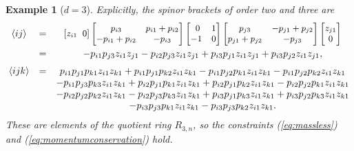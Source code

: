 \documentclass[english]{ourlematema}
\numberwithin{theorem}{section}
\newtheorem{example}[theorem]{Example}
\theoremstyle{definition}
\begin{document}
\begin{example}[$d=3$] \label{ex:d3}
Explicitly, the spinor brackets of order two and three are
$$ \begin{matrix} \langle i j \rangle & = &  \begin{small}
\begin{bmatrix} z_{i1} \!\! &\! 0 \end{bmatrix}
\begin{bmatrix}
                       p_{i3}  &       p_{i1} + p_{i2} \\
                       -p_{i1} + p_{i2} &       -p_{i3} \end{bmatrix}
\begin{bmatrix} \,\,0 & 1 \\ -1 & 0 \end{bmatrix}
\begin{bmatrix}   p_{j3} &  -p_{j1} + p_{j2} \\
                            p_{j1} + p_{j2} &        -p_{j3} \end{bmatrix}
\begin{bmatrix} z_{j1} \\ 0 \end{bmatrix} \end{small} \smallskip
\\
 & = &
-p_{i1} p_{j3} z_{i1} z_{j1} - p_{i2} p_{j3} z_{i1} z_{j1}
 + p_{i3} p_{j1} z_{i1} z_{j1} + p_{i3} p_{j2} z_{i1} z_{j1}, 
 \medskip \\
\langle ijk \rangle & = &
p_{i1} p_{j1} p_{k1} z_{i1} z_{k1} + p_{i1} p_{j1} p_{k2} z_{i1} z_{k1}
- p_{i1} p_{j2} p_{k1} z_{i1} z_{k1} - p_{i1} p_{j2} p_{k2} z_{i1} z_{k1} \\
& & - p_{i1} p_{j3} p_{k3} z_{i1} z_{k1}
+ p_{i2} p_{j1} p_{k1} z_{i1} z_{k1} + p_{i2} p_{j1} p_{k2} z_{i1} z_{k1} 
- p_{i2} p_{j2} p_{k1} z_{i1} z_{k1} \\ & & 
- p_{i2} p_{j2} p_{k2} z_{i1} z_{k1} 
 - p_{i2} p_{j3} p_{k3} z_{i1} z_{k1} + p_{i3} p_{j1} p_{k3} z_{i1} z_{k1}
+ p_{i3} p_{j2} p_{k3} z_{i1} z_{k1} \\ & &  - p_{i3} p_{j3} p_{k1} z_{i1} z_{k1} - p_{i3} p_{j3} p_{k2} z_{i1} z_{k1}.
\end{matrix}
$$
These are elements of the quotient ring $R_{3,n}$, so the constraints
(\ref{eq:massless}) and (\ref{eq:momentumconservation}) hold.          \end{example}
\end{document}
